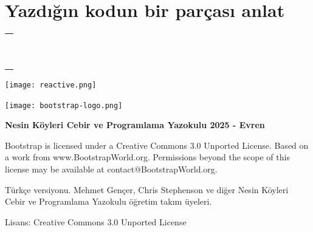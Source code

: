 \documentclass[12pt, a4paper]{article}
\begin{document}
\newpage
\section*{Yazdığın kodun bir parçası anlat}
 \vspace*{6ex}
\noindent \begin{tabular}{L{16cm} }
 {\dotfill } \\[6ex]
 {\dotfill } \\[6ex]
 {\dotfill } \\[6ex]
 {\dotfill } \\[6ex]
 {\dotfill } \\[6ex]
 {\dotfill } \\[6ex]
 {\dotfill } \\[6ex]
 {\dotfill } \\[6ex]
 {\dotfill } \\[6ex]
 {\dotfill } \\[6ex]
 {\dotfill } \\[6ex]
\end{tabular}
\newpage

\vspace*{0.8cm}
\begin{center}
\texttt{[image: reactive.png]}

\texttt{[image: bootstrap-logo.png]}
 
\end{center}

\vspace*{0.2cm}


\begin{center}
{\Large \bf{Nesin Köyleri Cebir ve Programlama Yazokulu 2025 - Evren}}

{\tiny Bootstrap is licensed under a Creative Commons 3.0 Unported License. Based on a work from
www.BootstrapWorld.org. Permissions beyond the scope of this license may be available at
contact@BootstrapWorld.org.

Türkçe versiyonu. Mehmet Gençer, Chris Stephenson ve diğer Nesin Köyleri Cebir ve Programlama Yazokulu öğretim takım üyeleri.

Lisans: Creative Commons 3.0 Unported License} 
\end{center}
\end{document}
